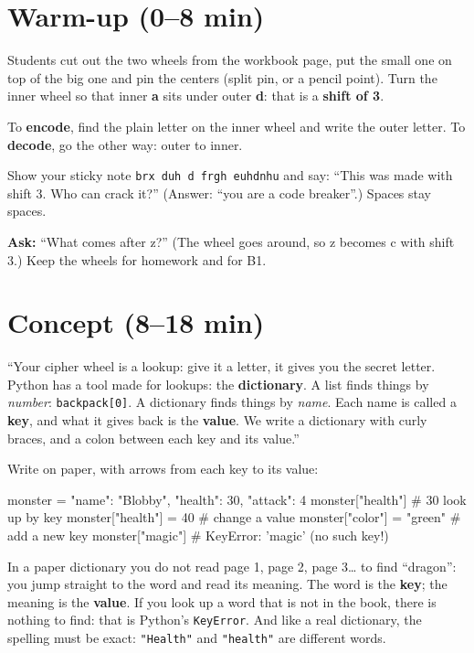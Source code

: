 \section{Warm-up (0--8 min)}
\begin{unplugged}
Students cut out the two wheels from the workbook page, put the small one on top of the big one and pin the centers
(split pin, or a pencil point). Turn the inner wheel so that inner \textbf{a} sits under outer \textbf{d}: that is a \textbf{shift of 3}.
\par To \textbf{encode}, find the plain letter on the inner wheel and write the outer letter. To \textbf{decode}, go the other way: outer to inner.
\par Show your sticky note \texttt{brx duh d frgh euhdnhu} and say: \enquote{This was made with shift 3. Who can crack it?}
(Answer: \enquote{you are a code breaker}.) Spaces stay spaces.
\par\textbf{Ask:} \enquote{What comes after z?} (The wheel goes around, so z becomes c with shift 3.) Keep the wheels for homework and for B1.
\end{unplugged}

\section{Concept (8--18 min)}
\begin{teacherscript}[Say]
\enquote{Your cipher wheel is a lookup: give it a letter, it gives you the secret letter. Python has a tool made for lookups:
the \textbf{dictionary}. A list finds things by \emph{number}: \texttt{backpack[0]}. A dictionary finds things by \emph{name}.
Each name is called a \textbf{key}, and what it gives back is the \textbf{value}. We write a dictionary with curly braces,
and a colon between each key and its value.}
\end{teacherscript}
Write on paper, with arrows from each key to its value:
\begin{pycode}
monster = {"name": "Blobby", "health": 30, "attack": 4}
monster["health"]              # 30   look up by key
monster["health"] = 40         # change a value
monster["color"] = "green"    # add a new key
monster["magic"]               # KeyError: 'magic'  (no such key!)
\end{pycode}

\begin{analogy}
In a paper dictionary you do not read page 1, page 2, page 3\ldots{} to find \enquote{dragon}: you jump straight to the word and read its meaning.
The word is the \textbf{key}; the meaning is the \textbf{value}. If you look up a word that is not in the book, there is nothing to find:
that is Python's \texttt{KeyError}. And like a real dictionary, the spelling must be exact: \texttt{"Health"} and \texttt{"health"} are different words.
\end{analogy}

